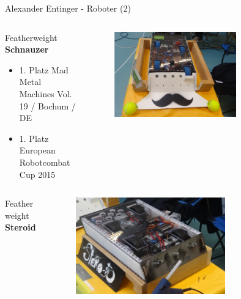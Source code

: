 \documentclass{beamer}
\begin{document}
\begin{frame}{Alexander Entinger - Roboter (2)}
	\begin{columns}
		\begin{column}{0.5\textwidth}
			\begin{large}Featherweight \textbf{Schnauzer}\end{large}
			\begin{itemize}
				\item 1. Platz Mad Metal Machines Vol. 19 / Bochum / DE
				\item 1. Platz European Robotcombat Cup 2015
			\end{itemize}
		\end{column}
		\begin{column}{0.5\textwidth}
			\begin{figure}[H]
				\centering
				\includegraphics[width=0.7\textwidth]{./images/robot-schnauzer.jpg}
				\label{fig:robot-schnauzer}
			\end{figure}
		\end{column}
	\end{columns}
	
	\begin{columns}
		\begin{column}{0.5\textwidth}
			\begin{large}Featherweight \textbf{Steroid}\end{large}
		\end{column}
		\begin{column}{0.5\textwidth}
			\begin{figure}[H]
				\centering
				\includegraphics[width=0.7\textwidth]{./images/robot-steroid.jpg}
				\label{fig:robot-steroid}
			\end{figure}
		\end{column}
	\end{columns}
\end{frame}
\end{document}
